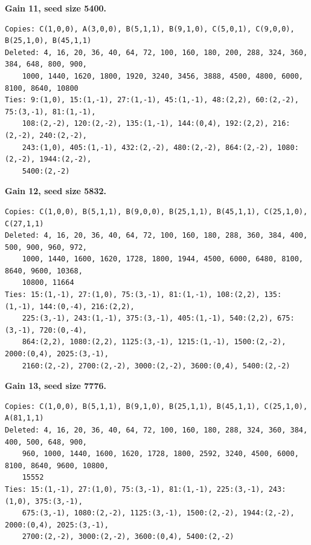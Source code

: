 \noindent\textbf{Gain 11, seed size 5400.}
\begin{scriptsize}
\begin{verbatim}
Copies: C(1,0,0), A(3,0,0), B(5,1,1), B(9,1,0), C(5,0,1), C(9,0,0), B(25,1,0), B(45,1,1)
Deleted: 4, 16, 20, 36, 40, 64, 72, 100, 160, 180, 200, 288, 324, 360, 384, 648, 800, 900,
    1000, 1440, 1620, 1800, 1920, 3240, 3456, 3888, 4500, 4800, 6000, 8100, 8640, 10800
Ties: 9:(1,0), 15:(1,-1), 27:(1,-1), 45:(1,-1), 48:(2,2), 60:(2,-2), 75:(3,-1), 81:(1,-1),
    108:(2,-2), 120:(2,-2), 135:(1,-1), 144:(0,4), 192:(2,2), 216:(2,-2), 240:(2,-2),
    243:(1,0), 405:(1,-1), 432:(2,-2), 480:(2,-2), 864:(2,-2), 1080:(2,-2), 1944:(2,-2),
    5400:(2,-2)
\end{verbatim}
\end{scriptsize}

\noindent\textbf{Gain 12, seed size 5832.}
\begin{scriptsize}
\begin{verbatim}
Copies: C(1,0,0), B(5,1,1), B(9,0,0), B(25,1,1), B(45,1,1), C(25,1,0), C(27,1,1)
Deleted: 4, 16, 20, 36, 40, 64, 72, 100, 160, 180, 288, 360, 384, 400, 500, 900, 960, 972,
    1000, 1440, 1600, 1620, 1728, 1800, 1944, 4500, 6000, 6480, 8100, 8640, 9600, 10368,
    10800, 11664
Ties: 15:(1,-1), 27:(1,0), 75:(3,-1), 81:(1,-1), 108:(2,2), 135:(1,-1), 144:(0,-4), 216:(2,2),
    225:(3,-1), 243:(1,-1), 375:(3,-1), 405:(1,-1), 540:(2,2), 675:(3,-1), 720:(0,-4),
    864:(2,2), 1080:(2,2), 1125:(3,-1), 1215:(1,-1), 1500:(2,-2), 2000:(0,4), 2025:(3,-1),
    2160:(2,-2), 2700:(2,-2), 3000:(2,-2), 3600:(0,4), 5400:(2,-2)
\end{verbatim}
\end{scriptsize}

\noindent\textbf{Gain 13, seed size 7776.}
\begin{scriptsize}
\begin{verbatim}
Copies: C(1,0,0), B(5,1,1), B(9,1,0), B(25,1,1), B(45,1,1), C(25,1,0), A(81,1,1)
Deleted: 4, 16, 20, 36, 40, 64, 72, 100, 160, 180, 288, 324, 360, 384, 400, 500, 648, 900,
    960, 1000, 1440, 1600, 1620, 1728, 1800, 2592, 3240, 4500, 6000, 8100, 8640, 9600, 10800,
    15552
Ties: 15:(1,-1), 27:(1,0), 75:(3,-1), 81:(1,-1), 225:(3,-1), 243:(1,0), 375:(3,-1),
    675:(3,-1), 1080:(2,-2), 1125:(3,-1), 1500:(2,-2), 1944:(2,-2), 2000:(0,4), 2025:(3,-1),
    2700:(2,-2), 3000:(2,-2), 3600:(0,4), 5400:(2,-2)
\end{verbatim}
\end{scriptsize}

